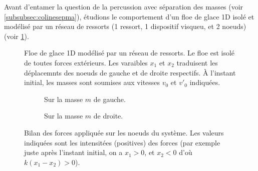 Avant d'entamer la question de la percussion avec séparation des masses (voir \cref{subsubsec:colinesepma}), étudions le comportement d'un floe de glace 1D isolé et modélisé par un réseau de ressorts (1 ressort, 1 dispositif visqueu, et 2 noeuds) (voir \cref{fig:deplacement1d}).
\begin{figure}[!h]
    \centering
    \caption{Floe de glace 1D modélisé par un réseau de ressorts. Le floe est isolé de toutes forces extérieurs. Les varaibles $x_1$ et $x_2$ traduisent les déplacemnts des noeuds de gauche et de droite respectifs. À l'instant initial, les masses sont soumises aux vitesses $v_0$ et $v'_0$ indiquées.}
    \label{fig:deplacement1d}
\end{figure}


\begin{figure}[!h]
    \begin{subfigure}[b]{0.33\textwidth}
        \centering
        \caption{Sur la masse $m$ de gauche.}
    \end{subfigure}
    \begin{subfigure}[b]{0.3\textwidth}
        \centering
        \caption{Sur la masse $m$ de droite.}
    \end{subfigure}
       \caption{Bilan des forces appliquée sur les noeuds du système. Les valeurs indiquées sont les intensitées (positives) des forces (par exemple juste après l'instant initial, on a $x_1 > 0$, et $x_2 < 0$ d'où $k(x_1-x_2) > 0$).}
       \label{fig:bilan0}
\end{figure}


